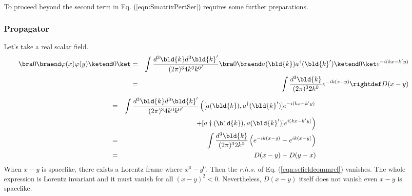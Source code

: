 To proceed beyond the second term in Eq. (\ref{eqn:SmatrixPertSer}) requires some
further preparations.

\subsubsection{Propagator}
Let's take a real scalar field.
\begin{eqnarray}
\bra 0 \braend \varphi(x) \varphi(y) \ketend 0 \ket
&=&
\int \frac{d^3 \bld{k} d^3 \bld{k}'}{(2\pi)^3 4 k^0 {k^0}'} 
\bra 0 \braend a(\bld{k}) a^\dagger(\bld{k}') \ketend 0 \ket
e^{-i(kx - k'y)}
\nonumber\\
&=&
\int \frac{d^3 \bld{k} }{(2\pi)^3 2 k^0} 
e^{-ik(x - y)}
\rightdef
D(x-y)
\end{eqnarray}
\begin{eqnarray}
[\varphi(x), \varphi(y)]
&=&
\int \frac{d^3 \bld{k} d^3 \bld{k}'}{(2\pi)^3 4 k^0 {k^0}'} 
\left(
[a(\bld{k}), a^\dagger(\bld{k}')]e^{-i(kx - k'y)}
\right.
\nonumber\\
&&
\left.
\hspace{35mm}
+
[a\dagger(\bld{k}), a(\bld{k}')]e^{i(kx - k'y)}
\right)
\nonumber\\
&=&
\int \frac{d^3 \bld{k} }{(2\pi)^3 2 k^0} 
\left(
e^{-ik(x - y)} - e^{ik(x - y)}
\right)
\nonumber\\
&=&
D(x-y) - D(y-x)
\label{eqn:scfieldcommrel}
\end{eqnarray}
When $x-y$ is spacelike, there exists a Lorentz frame where $x^0 - y^0$.
Then the $r.h.s.$ of Eq. (\ref{eqn:scfieldcommrel}) vanishes. 
The whole expression is Lorentz invariant and it must vanish for all $(x-y)^2 < 0$.
Nevertheless, $D(x-y)$ itself does not vanish even $x-y$ is spacelike.

